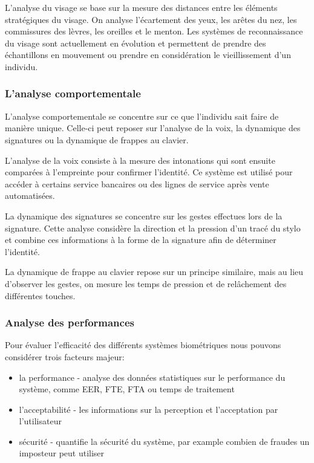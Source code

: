 L'analyse du visage se base sur la mesure des distances entre les éléments stratégiques du visage. On analyse l'écartement des yeux,  les arêtes du nez, les commissures des lèvres, les oreilles et le menton. Les systèmes de reconnaissance du visage sont actuellement en évolution et permettent de prendre des échantillons en mouvement ou prendre en considération le vieillissement d'un individu.


\subsubsection{L'analyse comportementale}

L'analyse comportementale se concentre sur ce que l'individu sait faire de manière unique. Celle-ci peut reposer sur l'analyse de la voix, la dynamique des signatures ou la dynamique de frappes au clavier.

L'analyse de la voix consiste à la mesure des intonations qui sont ensuite comparées à l'empreinte pour confirmer l'identité. Ce système est utilisé pour accéder à certains service bancaires ou des lignes de service après vente automatisées.

La dynamique des signatures se concentre sur les gestes effectues lors de la signature. Cette analyse considère la direction et la pression d'un tracé du stylo et combine ces informations à la forme de la signature afin de déterminer l'identité.

La dynamique de frappe au clavier repose sur un principe similaire, mais au lieu d'observer les gestes, on mesure les temps de pression et de relâchement des différentes touches.

\subsubsection{Analyse des performances}

Pour évaluer l'efficacité des différents systèmes biométriques nous pouvons considérer trois facteurs majeur:

\begin{itemize}
\item la performance - analyse des données statistiques sur le performance du système, comme EER, FTE, FTA ou temps de traitement
\item l'acceptabilité - les informations sur la perception et l'acceptation par l'utilisateur 
\item sécurité - quantifie la sécurité du système, par example combien de fraudes un imposteur peut utiliser
\end{itemize}

